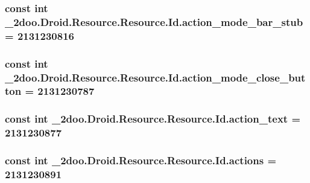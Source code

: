 \hypertarget{class__2doo_1_1_droid_1_1_resource_1_1_id_bd0410e3da1aa7912d94a95629682295}{
\subsubsection[{action\_\-mode\_\-bar\_\-stub}]{\setlength{\rightskip}{0pt plus 5cm}const int \_\-2doo.Droid.Resource.Resource.Id.action\_\-mode\_\-bar\_\-stub = 2131230816}}
\label{class__2doo_1_1_droid_1_1_resource_1_1_id_bd0410e3da1aa7912d94a95629682295}


\hypertarget{class__2doo_1_1_droid_1_1_resource_1_1_id_58440a6597612fb33fd0a6260bf6a904}{
\subsubsection[{action\_\-mode\_\-close\_\-button}]{\setlength{\rightskip}{0pt plus 5cm}const int \_\-2doo.Droid.Resource.Resource.Id.action\_\-mode\_\-close\_\-button = 2131230787}}
\label{class__2doo_1_1_droid_1_1_resource_1_1_id_58440a6597612fb33fd0a6260bf6a904}


\hypertarget{class__2doo_1_1_droid_1_1_resource_1_1_id_d5bd01352ade95ab05a1ecd31a1aa8ee}{
\subsubsection[{action\_\-text}]{\setlength{\rightskip}{0pt plus 5cm}const int \_\-2doo.Droid.Resource.Resource.Id.action\_\-text = 2131230877}}
\label{class__2doo_1_1_droid_1_1_resource_1_1_id_d5bd01352ade95ab05a1ecd31a1aa8ee}


\hypertarget{class__2doo_1_1_droid_1_1_resource_1_1_id_3b16f72c43f3d6d4f7b66992c9996359}{
\subsubsection[{actions}]{\setlength{\rightskip}{0pt plus 5cm}const int \_\-2doo.Droid.Resource.Resource.Id.actions = 2131230891}}
\label{class__2doo_1_1_droid_1_1_resource_1_1_id_3b16f72c43f3d6d4f7b66992c9996359}


